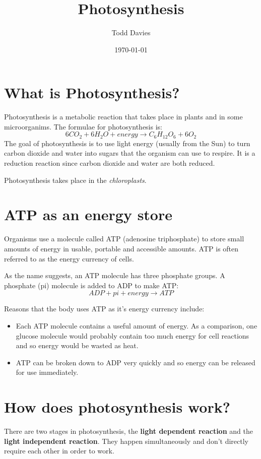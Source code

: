 \documentclass{article}
\title{Photosynthesis}
\author{Todd Davies}
\date{\today}
\begin{document}
\lhead{\today}

\maketitle

\section*{What is Photosynthesis?}
\thispagestyle{empty}
Photosynthesis is a metabolic reaction that takes place in plants and in some microorganims. The formulae for photosynthesis is:
\[
	6CO_2 + 6H_2O + energy \rightarrow C_6H_{12}O_6 + 6O_2
\]
The goal of photosynthesis is to use light energy (usually from the Sun) to turn carbon dioxide and water into sugars that the organism can use to respire. It is a reduction reaction since carbon dioxide and water are both reduced.

Photosynthesis takes place in the \textit{chloroplasts}.
\section*{ATP as an energy store}
Organisms use a molecule called ATP (adenosine triphosphate) to store small amounts of energy in usable, portable and accessible amounts. ATP is often referred to as the energy currency of cells. 

As the name suggests, an ATP molecule has three phosphate groups. A phosphate (pi) molecule is added to ADP to make ATP:
\[
	ADP + pi + energy \rightarrow ATP
\]

Reasons that the body uses ATP as it's energy currency include:
\begin{itemize}
	\item Each ATP molecule contains a useful amount of energy. As a comparison, one glucose molecule would probably contain too much energy for cell reactions and so energy would be wasted as heat.
	\item ATP can be broken down to ADP very quickly and so energy can be released for use immediately.
\end{itemize}

\section*{How does photosynthesis work?}
There are two stages in photosynthesis, the \textbf{light dependent reaction} and the \textbf{light independent reaction}. They happen simultaneously and don't directly require each other in order to work.
\end{document}
